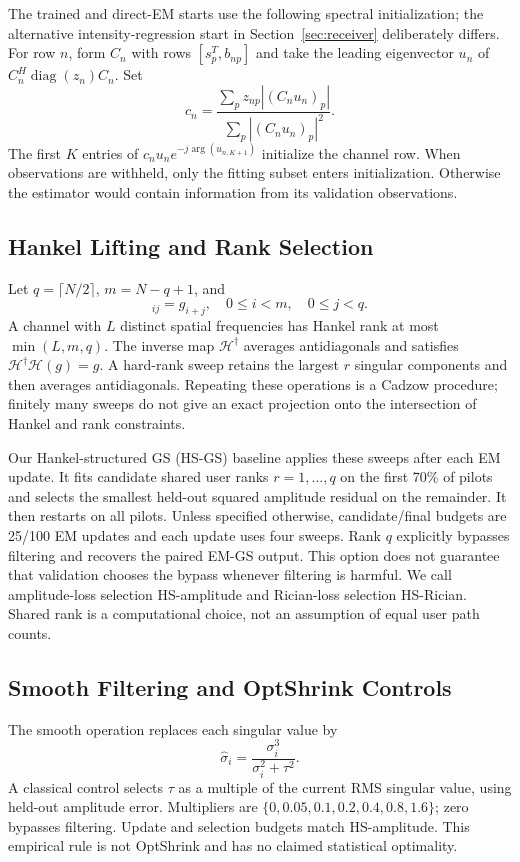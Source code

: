 \documentclass[10pt,journal,letterpaper]{IEEEtran}
\newcommand{\HH}{\mathcal{H}}
\DeclareMathOperator{\diag}{diag}
\begin{document}
The trained and direct-EM starts use the following spectral initialization; the alternative intensity-regression start in Section~\ref{sec:receiver} deliberately differs. For row $n$, form $C_n$ with rows $[s_p^T,b_{np}]$ and take the leading eigenvector $u_n$ of $C_n^H\diag(z_n)C_n$. Set
\begin{equation}
 c_n=\frac{\sum_p z_{np}|(C_nu_n)_p|}{\sum_p|(C_nu_n)_p|^2}.
\end{equation}
The first $K$ entries of $c_nu_ne^{-j\arg(u_{n,K+1})}$ initialize the channel row. When observations are withheld, only the fitting subset enters initialization. Otherwise the estimator would contain information from its validation observations.

\subsection{Hankel Lifting and Rank Selection}
Let $q=\lceil N/2\rceil$, $m=N-q+1$, and
\begin{equation}
 [\HH(g)]_{ij}=g_{i+j},\quad 0\le i<m,\quad0\le j<q.
\end{equation}
A channel with $L$ distinct spatial frequencies has Hankel rank at most $\min(L,m,q)$. The inverse map $\HH^\dagger$ averages antidiagonals and satisfies $\HH^\dagger\HH(g)=g$. A hard-rank sweep retains the largest $r$ singular components and then averages antidiagonals. Repeating these operations is a Cadzow procedure; finitely many sweeps do not give an exact projection onto the intersection of Hankel and rank constraints.

Our Hankel-structured GS (HS-GS) baseline applies these sweeps after each EM update. It fits candidate shared user ranks $r=1,\ldots,q$ on the first 70\% of pilots and selects the smallest held-out squared amplitude residual on the remainder. It then restarts on all pilots. Unless specified otherwise, candidate/final budgets are 25/100 EM updates and each update uses four sweeps. Rank $q$ explicitly bypasses filtering and recovers the paired EM-GS output. This option does not guarantee that validation chooses the bypass whenever filtering is harmful. We call amplitude-loss selection HS-amplitude and Rician-loss selection HS-Rician. Shared rank is a computational choice, not an assumption of equal user path counts.

\subsection{Smooth Filtering and OptShrink Controls}
The smooth operation replaces each singular value by
\begin{equation}
 \widehat\sigma_i=\frac{\sigma_i^3}{\sigma_i^2+\tau^2}.
 \label{eq:shrink}
\end{equation}
A classical control selects $\tau$ as a multiple of the current RMS singular value, using held-out amplitude error. Multipliers are $\{0,0.05,0.1,0.2,0.4,0.8,1.6\}$; zero bypasses filtering. Update and selection budgets match HS-amplitude. This empirical rule is not OptShrink and has no claimed statistical optimality.
\end{document}
